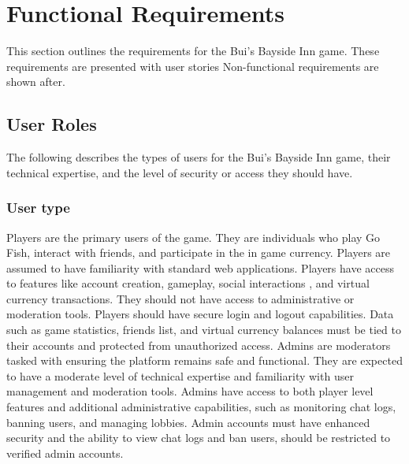 \clearpage
\section{Functional Requirements}

This section outlines the requirements for the Bui’s Bayside Inn game. These requirements are presented with user stories Non-functional requirements are shown after.


\subsection{User Roles}

The following describes the types of users for the Bui’s Bayside Inn game, their technical expertise, and the level of security or access they should have. 



\subsubsection{User type}

Players are the primary users of the game. They are individuals who play Go Fish, interact with friends, and participate in the in game currency. Players are assumed to have familiarity with standard web applications. Players have access to features like account creation, gameplay, social interactions , and virtual currency transactions. They should not have access to administrative or moderation tools. Players should have secure login and logout capabilities. Data such as game statistics, friends list, and virtual currency balances must be tied to their accounts and protected from unauthorized access. Admins are moderators tasked with ensuring the platform remains safe and functional. They are expected to have a moderate level of technical expertise and familiarity with user management and moderation tools. Admins have access to both player level features and additional administrative capabilities, such as monitoring chat logs, banning users, and managing lobbies. Admin accounts must have enhanced security and the ability to view chat logs and ban users, should be restricted to verified admin accounts.

